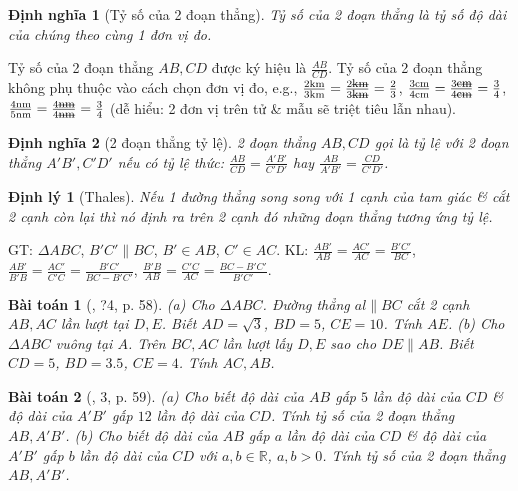 \documentclass{article}
\newtheorem{baitoan}{Bài toán}
\newtheorem{dinhly}{Định lý}
\newtheorem{dinhnghia}{Định nghĩa}
\begin{document}
\begin{dinhnghia}[Tỷ số của 2 đoạn thẳng]
	\emph{Tỷ số của 2 đoạn thẳng} là tỷ số độ dài của chúng theo cùng 1 đơn vị đo.
\end{dinhnghia}
Tỷ số của 2 đoạn thẳng $AB,CD$ được ký hiệu là $\frac{AB}{CD}$. Tỷ số của 2 đoạn thẳng không phụ thuộc vào cách chọn đơn vị đo, e.g., $\frac{\rm2km}{\rm3km} = \frac{2\footnotesize\mbox{\st{km}}}{3\footnotesize\mbox{\st{km}}} = \frac{2}{3}$, $\frac{\rm3cm}{\rm4cm} = \frac{3\footnotesize\mbox{\st{cm}}}{4\footnotesize\mbox{\st{cm}}} = \frac{3}{4}$, $\frac{\rm4nm}{\rm5nm} = \frac{4\footnotesize\mbox{\st{nm}}}{4\footnotesize\mbox{\st{nm}}} = \frac{3}{4}$ (dễ hiểu: 2 đơn vị trên tử \& mẫu sẽ triệt tiêu lẫn nhau).

\begin{dinhnghia}[2 đoạn thẳng tỷ lệ]
	2 đoạn thẳng $AB,CD$ gọi là \emph{tỷ lệ} với 2 đoạn thẳng $A'B',C'D'$ nếu có tỷ lệ thức: $\frac{AB}{CD} = \frac{A'B'}{C'D'}$ hay $\frac{AB}{A'B'} = \frac{CD}{C'D'}$.
\end{dinhnghia}

\begin{dinhly}[Thales]
	\label{thm: Thales}
	Nếu 1 đường thẳng song song với 1 cạnh của  tam giác \& cắt 2 cạnh còn lại thì nó định ra trên 2 cạnh đó những đoạn thẳng tương ứng tỷ lệ.
\end{dinhly}
GT: $\Delta ABC$, $B'C'\parallel BC$, $B'\in AB$, $C'\in AC$. KL: $\frac{AB'}{AB} = \frac{AC'}{AC} = \frac{B'C'}{BC}$, $\frac{AB'}{B'B} = \frac{AC'}{C'C} = \frac{B'C'}{BC - B'C'}$, $\frac{B'B}{AB} = \frac{C'C}{AC} = \frac{BC - B'C'}{B'C'}$.

\begin{baitoan}[\cite{SGK_Toan_8_tap_2}, ?4, p. 58]
	(a) Cho $\Delta ABC$. Đường thẳng $al\parallel BC$ cắt 2 cạnh $AB,AC$ lần lượt tại $D,E$. Biết $AD = \sqrt{3}$, $BD = 5$, $CE = 10$. Tính $AE$. (b) Cho $\Delta ABC$ vuông tại $A$. Trên $BC,AC$ lần lượt lấy $D,E$ sao cho $DE\parallel AB$. Biết $CD = 5$, $BD = 3.5$, $CE = 4$. Tính $AC,AB$.
\end{baitoan}

\begin{baitoan}[\cite{SGK_Toan_8_tap_2}, 3, p. 59]
	(a) Cho biết độ dài của $AB$ gấp $5$ lần độ dài của $CD$ \& độ dài của $A'B'$ gấp $12$ lần độ dài của $CD$. Tính tỷ số của 2 đoạn thẳng $AB,A'B'$. (b) Cho biết độ dài của $AB$ gấp $a$ lần độ dài của $CD$ \& độ dài của $A'B'$ gấp $b$ lần độ dài của $CD$ với $a,b\in\mathbb{R}$, $a,b > 0$. Tính tỷ số của 2 đoạn thẳng $AB,A'B'$.
\end{baitoan}
\end{document}
